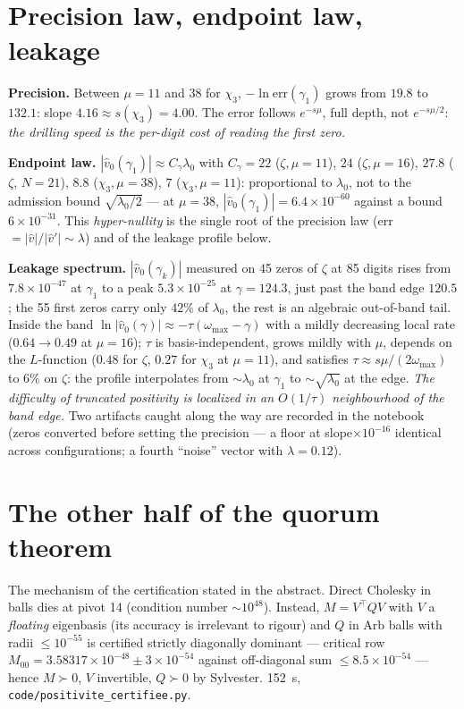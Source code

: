 \documentclass[11pt]{article}
\theoremstyle{remark}\newtheorem*{remark}{Remark}
\begin{document}
\section{Precision law, endpoint law, leakage}
\textbf{Precision.} Between $\mu=11$ and $38$ for $\chi_3$, $-\ln\mathrm{err}(\gamma_1)$ grows from $19.8$ to $132.1$: slope $4.16\approx s(\chi_3)=4.00$. The error follows $e^{-s\mu}$, full depth, not $e^{-s\mu/2}$: \emph{the drilling speed is the per-digit cost of reading the first zero.}

\textbf{Endpoint law.} $|\hat v_0(\gamma_1)|\approx C_\gamma\lambda_0$ with $C_\gamma=22$ ($\zeta,\mu=11$), $24$ ($\zeta,\mu=16$), $27.8$ ($\zeta$, $N=21$), $8.8$ ($\chi_3,\mu=38$), $7$ ($\chi_3,\mu=11$): proportional to $\lambda_0$, not to the admission bound $\sqrt{\lambda_0/2}$ --- at $\mu=38$, $|\hat v_0(\gamma_1)|=6.4\times10^{-60}$ against a bound $6\times10^{-31}$. This \emph{hyper-nullity} is the single root of the precision law (err $=|\hat v|/|\hat v'|\sim\lambda$) and of the leakage profile below.

\textbf{Leakage spectrum.} $|\hat v_0(\gamma_k)|$ measured on 45 zeros of $\zeta$ at 85 digits rises from $7.8\times10^{-47}$ at $\gamma_1$ to a peak $5.3\times10^{-25}$ at $\gamma=124.3$, just past the band edge $120.5$; the 55 first zeros carry only $42\%$ of $\lambda_0$, the rest is an algebraic out-of-band tail. Inside the band $\ln|\hat v_0(\gamma)|\approx-\tau(\omega_{\max}-\gamma)$ with a mildly decreasing local rate ($0.64\to0.49$ at $\mu=16$); $\tau$ is basis-independent, grows mildly with $\mu$, depends on the $L$-function ($0.48$ for $\zeta$, $0.27$ for $\chi_3$ at $\mu=11$), and satisfies $\tau\approx s\mu/(2\omega_{\max})$ to $6\%$ on $\zeta$: the profile interpolates from $\sim\lambda_0$ at $\gamma_1$ to $\sim\sqrt{\lambda_0}$ at the edge. \emph{The difficulty of truncated positivity is localized in an $O(1/\tau)$ neighbourhood of the band edge.} Two artifacts caught along the way are recorded in the notebook (zeros converted before setting the precision --- a floor at slope$\times10^{-16}$ identical across configurations; a fourth ``noise'' vector with $\lambda=0.12$).

\section{The other half of the quorum theorem}
The mechanism of the certification stated in the abstract. Direct Cholesky in balls dies at pivot 14 (condition number $\sim10^{48}$). Instead, $M=V^{\!\top}QV$ with $V$ a \emph{floating} eigenbasis (its accuracy is irrelevant to rigour) and $Q$ in Arb balls with radii $\le10^{-55}$ is certified strictly diagonally dominant --- critical row $M_{00}=3.58317\times10^{-48}\pm3\times10^{-54}$ against off-diagonal sum $\le8.5\times10^{-54}$ --- hence $M\succ0$, $V$ invertible, $Q\succ0$ by Sylvester. 152~s, \texttt{code/positivite\_certifiee.py}.
\end{document}
